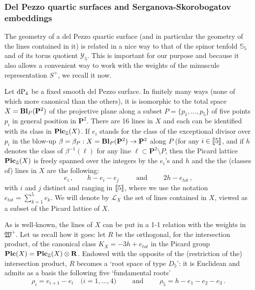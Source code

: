 \documentclass[11pt]{amsart}
\newcommand{\sk}{\smallskip}
\begin{document}
\subsubsection{\bf Del Pezzo quartic surfaces and Serganova-Skorobogatov embeddings}
\label{SS:dP4-SS-Embedding}
The geometry of  a del Pezzo quartic surface (and in particular the geometry of the lines contained in it)  is related in a nice way to that of the spinor tenfold $\mathbb S_5$ and of its torus quotient $\boldsymbol{\mathcal Y}_5$. This is important for our purpose and because it also allows a convenient way to work with the weights of the minuscule representation $S^+$, we recall it now. \sk 

Let ${\rm dP}_4$ be a fixed smooth del Pezzo surface. In finitely many ways (none of which more canonical than the others), it is isomorphic to the total space 
$X={\bf Bl}_P(\mathbf P^2)$ of the projective plane along a subset $P=\{p_1,\ldots,p_5\}$ of five points $p_i$ in general position in $\mathbf P^2$.  There are 16 lines in $X$ and each can be identified with its class in ${\bf Pic}_{\mathbb Z}(X)$. If $e_i$ stands for the class of the exceptional divisor over $p_i$ in the blow-up $\beta=\beta_P : X={\bf Bl}_P(\mathbf P^2)\rightarrow \mathbf P^2$ along $P$ (for any $i\in [\hspace{-0.05cm}[5]\hspace{-0.05cm}]$, and if $h$ denotes the class of $\beta^{-1}(\ell)$ for any line $\ell\subset \mathbf P^2\setminus P$, then the Picard lattice ${\bf Pic}_{\mathbb Z}(X)$ is freely spanned over the integers by the $e_i$'s and $h$ and the  
the (classes of) lines in $X$ are the following: 
$$
e_i\, , \qquad h-e_i-e_j\, \qquad \mbox{ and } \qquad 2h-e_{tot}\, , 
$$
with $i$ and $j$ distinct and ranging in
$[\hspace{-0.05cm}[5]\hspace{-0.05cm}]$, where we use the notation $e_{tot}=\sum_{k=1}^5 e_k$.  We will denote by $\mathcal L_X$ the set of lines contained in $X$, viewed as a subset of the Picard lattice of $X$.\sk

As  is well-known, the lines of $X$ can be put in a 1-1 relation with the weights in $\mathfrak W^+$. Let us recall how it goes: let $R$ be the orthogonal, for the intersection product, of the canonical class $K_X=-3h+e_{tot}$ in the  Picard group 
${\bf Pic}(X)={\bf Pic}_{\mathbb Z}(X)\otimes \mathbf R$. Endowed with the opposite of the (restriction of the) intersection product, $R$ becomes a `root space of type $D_5$': it is Euclidean and admits as a basis the following five `fundamental roots' 
$$
\rho_i=e_{i+1}-e_i\quad \big(i=1,\ldots,4\big) \qquad \mbox{ and }\qquad 
\rho_5=h-e_1-e_2-e_3\, . 
$$
\end{document}
